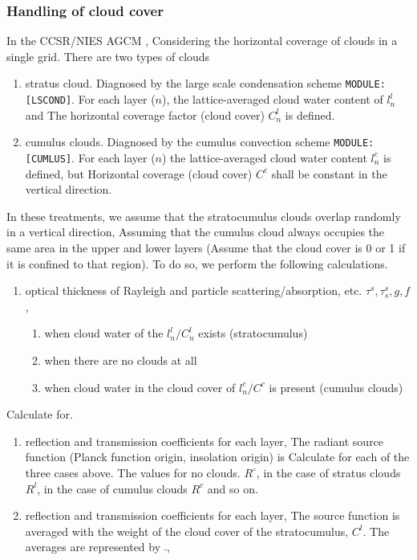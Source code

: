 \hypertarget{handling-of-cloud-cover}{%
\subsubsection{Handling of cloud cover}\label{handling-of-cloud-cover}}

In the CCSR/NIES AGCM , Considering the horizontal coverage of clouds in
a single grid. There are two types of clouds

\begin{enumerate}
\def\labelenumi{\arabic{enumi}.}
\item
  stratus cloud. Diagnosed by the large scale condensation scheme
  \texttt{MODULE:{[}LSCOND{]}}. For each layer (\(n\)), the
  lattice-averaged cloud water content of \(l^l_n\) and The horizontal
  coverage factor (cloud cover) \(C^l_n\) is defined.
\item
  cumulus clouds. Diagnosed by the cumulus convection scheme
  \texttt{MODULE:{[}CUMLUS{]}}. For each layer (\(n\)) the
  lattice-averaged cloud water content \(l^c_n\) is defined, but
  Horizontal coverage (cloud cover) \(C^c\) shall be constant in the
  vertical direction.
\end{enumerate}

In these treatments, we assume that the stratocumulus clouds overlap
randomly in a vertical direction, Assuming that the cumulus cloud always
occupies the same area in the upper and lower layers (Assume that the
cloud cover is 0 or 1 if it is confined to that region). To do so, we
perform the following calculations.

\begin{enumerate}
\def\labelenumi{\arabic{enumi}.}
\item
  optical thickness of Rayleigh and particle scattering/absorption, etc.
  \(\tau^s, \tau_s^s, g, f\),

  \begin{enumerate}
  \def\labelenumii{\arabic{enumii}.}
  \item
    when cloud water of the \(l^l_n/C^l_n\) exists (stratocumulus)
  \item
    when there are no clouds at all
  \item
    when cloud water in the cloud cover of \(l^c_n/C^c\) is present
    (cumulus clouds)
  \end{enumerate}
\end{enumerate}

Calculate for.

\begin{enumerate}
\def\labelenumi{\arabic{enumi}.}
\setcounter{enumi}{1}
\item
  reflection and transmission coefficients for each layer, The radiant
  source function (Planck function origin, insolation origin) is
  Calculate for each of the three cases above. The values for no clouds.
  \(R^\circ\), in the case of stratus clouds \(R^l\), in the case of
  cumulus clouds \(R^c\) and so on.
\item
  reflection and transmission coefficients for each layer, The source
  function is averaged with the weight of the cloud cover of the
  stratocumulus, \(C^l\). The averages are represented by \(\bar{}\),
\end{enumerate}

